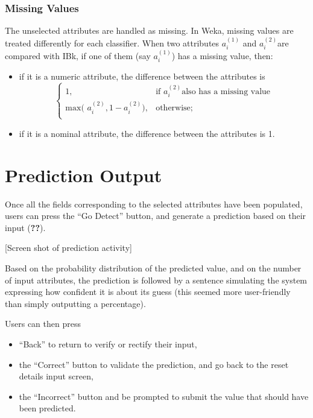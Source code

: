 \documentclass{mproj}
\begin{document}
\subsubsection*{Missing Values}
The unselected attributes are handled as missing. In Weka, missing values are treated differently for each classifier. When two attributes $a_i^{(1)}$ and $a_i^{(2)}$are compared with IBk, if one of them (say $a_i^{(1)}$) has a missing value, then:
\begin{itemize}[topsep=0pt]
	\item if it is a numeric attribute, the difference between the attributes is
	\begin{equation}
		\begin{cases}
			1, & \text{if } a_i^{(2)} \text{also has a missing value} \\
			\text{max( }a_i^{(2)} , 1 - a_i^{(2)} \text{)}, & \text{otherwise;} \\
		\end{cases}
	\end{equation}
	\item if it is a nominal attribute, the difference between the attributes is 1.	
\end{itemize}

\section{Prediction Output}

Once all the fields corresponding to the selected attributes have been populated, users can press the ``Go Detect'' button, and generate a prediction based on their input (\textbf{??}). 

[Screen shot of prediction activity]

Based on the probability distribution of the predicted value, and on the number of input attributes, the prediction is followed by a sentence simulating the system expressing how confident it is about its guess (this seemed more user-friendly than simply outputting a percentage).\par

Users can then press
\begin{itemize}[topsep=0pt]
	\item ``Back'' to return to verify or rectify their input,
	\item the ``Correct'' button to validate the prediction, and go back to the reset details input screen,
	\item the ``Incorrect'' button and be prompted to submit the value that should have been predicted.
\end{itemize}
\end{document}
